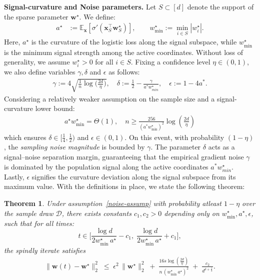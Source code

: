\documentclass{article}
\theoremstyle{plain}
\newtheorem{theorem}{Theorem}[section]
\theoremstyle{definition}
\theoremstyle{remark}
\begin{document}
\textbf{Signal-curvature and Noise parameters.}
Let $S \subset [d]$ denote the support of the sparse parameter $\mathbf w^\star$. We define:
\begin{align}
a^\star 
&:= \mathbb E_{\mathbf x}\!\left[\sigma'\!\left(\mathbf x_S^\top \mathbf w_S^\star\right)\right],
\qquad
w_{\min}^\star 
:= \min_{i\in S} |w_i^\star|.
\end{align}
Here, $a^\star$ is the curvature of the logistic loss along the signal
subspace, while $w_{\min}^\star$ is the minimum signal strength among the
active coordinates. Without loss of generality, we assume $w_i^\star > 0$ for all
$i \in S$. Fixing a confidence level $\eta \in (0,1)$, we also define variables $\gamma ,\delta$ and $\epsilon$ as follows:
\begin{align*}
\gamma  := 4\sqrt{\frac{1}{n}\log\!\Big(\frac{2d}{\eta}\Big)},
\quad 
\delta:=\frac{1}{2}-\frac{\gamma}{a^{*}w_{min}^\star},
\quad
\epsilon 
:= 1 - 4a^{*}.
\end{align*}
Considering a relatively weaker assumption on the sample size and a signal-curvature lower bound:
\begin{align}
\label{noise-assump}
a^\star w_{\min}^\star = \Theta(1),
\quad 
 n\geq \frac{256}{(a^{*}w_{\min}^\star)^2} \log (\frac{2d}{\eta})
\end{align}
which ensures $\delta \in [\frac{1}{4},\frac{1}{2})$ and $\epsilon \in (0,1)$. On this event, with probability $(1-\eta)$, the \textit{sampling noise magnitude} is bounded by $\gamma$. The parameter 
$\delta$ acts as a signal–noise separation margin, guaranteeing that the empirical gradient noise $\gamma$ is dominated by the population signal along the active coordinates $a^{*}w_{min}^\star$. Lastly, $\epsilon$ signifies the curvature deviation along the signal subspace from its maximum value. With the definitions in place, we state the following theorem:

\begin{theorem}
\label{thm:spindly_upper}
Under assumption~\eqref{noise-assump} with probability atleast $1-\eta$ over the sample draw $\mathcal{D}$, there exists constants $c_1,c_2>0$ depending only on $w_{\min}^\star, a^\star, \epsilon$, such that for all times:
\[
t \in \Big[
\frac{\log d}{2w_{\min}^\star\, a^\star}-c_1,\;
\frac{\log d}{2w_{\min}^\star\, a^\star}+c_1
\Big],
\]
the spindly iterate satisfies
\begin{align}
\label{eq:spindly_l2_bound}
\|\mathbf w(t)-\mathbf w^\star\|_2^2
\;\le\;
\epsilon^2\,\|\mathbf w^\star\|_2^2
\;+\;
\frac{16s\log (\frac{2d}{\eta})}{n\, (w_{\min}^\star\, a^\star)^2}
\;+\;
\frac{c_2}{d^{\delta + \frac{1}{2}}}.
\end{align}
\end{theorem}
\end{document}

